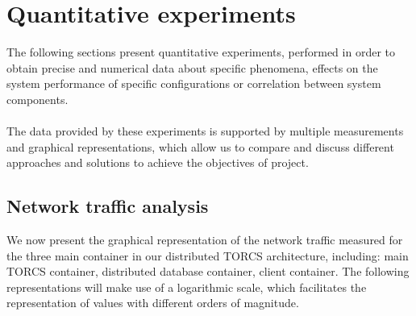 \section{Quantitative experiments}
The following sections present quantitative experiments, performed in order to obtain precise and numerical data about specific phenomena, effects on the system performance of specific configurations or correlation between system components. \\ \\
The data provided by these experiments is supported by multiple measurements and graphical representations, which allow us to compare and discuss different approaches and solutions to achieve the objectives of project.

\subsection{Network traffic analysis}
We now present the graphical representation of the network traffic measured for the three main container in our distributed TORCS architecture, including: main TORCS container, distributed database container, client container. The following representations will make use of a logarithmic scale, which facilitates the representation of values with different orders of magnitude.
